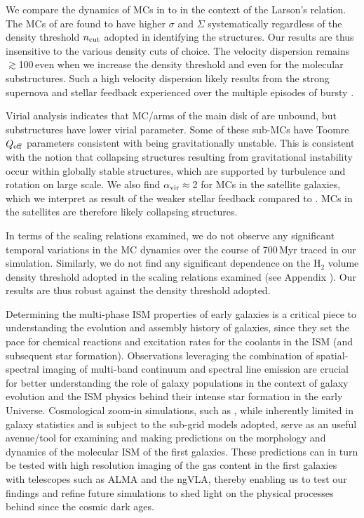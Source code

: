 \IfFileExists{emulateapjlegacy.cls}{\documentclass[iop]{emulateapjlegacy}}{\documentclass[iop]{emulateapj}}
\begin{document}
We compare the dynamics of MCs in \flower to \obs in the context of the Larson's relation.
The MCs of \flower are found to have higher $\sigma$ and $\Sigma$ systematically regardless of the
density threshold $n_{\rm cut}$ adopted in identifying the structures.
Our results are thus insensitive to the various density cuts of choice.
The velocity dispersion remains $\gtrsim$100\,\kms even when we increase the
density threshold and even for the molecular substructures.
Such a high velocity dispersion likely results from
the strong supernova and stellar feedback \flower experienced over the multiple episodes of bursty \SF.

Virial analysis indicates that MC/arms of the main disk of \flower are unbound, but substructures have
lower virial parameter. Some of these sub-MCs have Toomre $Q_{\rm eff}$ parameters consistent with being
gravitationally unstable. This is consistent with the notion that collapsing structures resulting from
gravitational instability occur within globally stable structures, which are
supported by turbulence and rotation on large scale.
We also find $\alpha_{\rm vir}\approx$\,2 for MCs in the satellite galaxies, which we interpret as
result of the weaker stellar feedback compared to \flower.
MCs in the satellites are therefore likely collapsing structures.

In terms of the scaling relations examined, we do not observe any significant
temporal variations in the MC dynamics over the course of 700\,Myr traced in our simulation.
Similarly, we do not find any significant dependence on the H$_2$ volume density threshold adopted
in the scaling relations examined (see Appendix ).
Our results are thus robust against the density threshold adopted.

Determining the multi-phase ISM properties of early galaxies
is a critical piece to understanding the evolution and
assembly history of galaxies, since they set the pace
for chemical reactions and excitation rates for the coolants in the ISM (and subsequent star formation).
Observations leveraging the combination of spatial-spectral imaging of
multi-band continuum and spectral line emission are crucial for better understanding
the role of \highz galaxy populations
in the context of galaxy evolution and the ISM physics behind their intense star formation in the early Universe.
Cosmological zoom-in simulations, such as , while inherently limited in galaxy
statistics and is subject to the sub-grid models adopted,
serve as an useful avenue/tool for examining and making predictions on the morphology and dynamics of
the molecular ISM of the first galaxies.
These predictions can in turn be
tested with high resolution imaging of the gas content in the first galaxies with telescopes such as ALMA and the ngVLA, thereby
enabling us to test our findings and refine future simulations to shed light on the physical processes behind
\SF since the cosmic dark ages.
\end{document}
